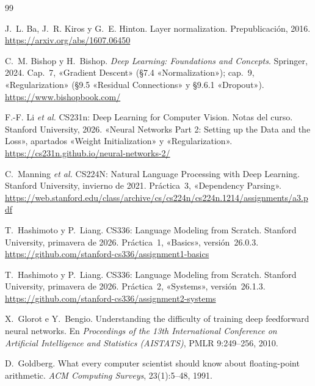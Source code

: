 \begin{thebibliography}{99}
\small
\def\UrlBreaks{\do\/\do-}

J.~L. Ba, J.~R. Kiros y G.~E. Hinton.
\newblock Layer normalization.
\newblock Prepublicación, 2016.
\newblock \url{https://arxiv.org/abs/1607.06450}

C.~M. Bishop y H.~Bishop.
\newblock \emph{Deep Learning: Foundations and Concepts}.
\newblock Springer, 2024.
\newblock Cap.~7, «Gradient Descent» (§7.4 «Normalization»); cap.~9, «Regularization» (§9.5 «Residual Connections» y §9.6.1 «Dropout»).
\newblock \url{https://www.bishopbook.com/}

F.-F. Li \emph{et al.}
\newblock CS231n: Deep Learning for Computer Vision. Notas del curso.
\newblock Stanford University, 2026. «Neural Networks Part 2: Setting up the Data and the Loss», apartados «Weight Initialization» y «Regularization».
\newblock \url{https://cs231n.github.io/neural-networks-2/}

C.~Manning \emph{et al.}
\newblock CS224N: Natural Language Processing with Deep Learning.
\newblock Stanford University, invierno de 2021. Práctica~3, «Dependency Parsing».
\newblock \url{https://web.stanford.edu/class/archive/cs/cs224n/cs224n.1214/assignments/a3.pdf}

T.~Hashimoto y P.~Liang.
\newblock CS336: Language Modeling from Scratch.
\newblock Stanford University, primavera de 2026. Práctica~1, «Basics», versión~26.0.3.
\newblock \url{https://github.com/stanford-cs336/assignment1-basics}

T.~Hashimoto y P.~Liang.
\newblock CS336: Language Modeling from Scratch.
\newblock Stanford University, primavera de 2026. Práctica~2, «Systems», versión~26.1.3.
\newblock \url{https://github.com/stanford-cs336/assignment2-systems}

X.~Glorot e Y.~Bengio.
\newblock Understanding the difficulty of training deep feedforward neural networks.
\newblock En \emph{Proceedings of the 13th International Conference on Artificial Intelligence and Statistics (AISTATS)}, PMLR 9:249--256, 2010.

D.~Goldberg.
\newblock What every computer scientist should know about floating-point arithmetic.
\newblock \emph{ACM Computing Surveys}, 23(1):5--48, 1991.


\end{thebibliography}
